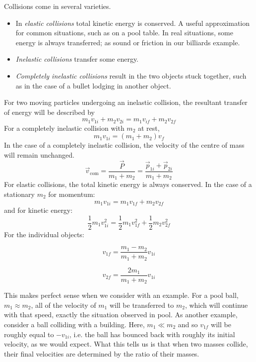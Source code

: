 \documentclass[12pt]{report}
\begin{document}
\bigskip
Collisions come in several varieties.

\begin{itemize}
    \item In \textit{elastic collisions} total kinetic energy is conserved.
    A useful approximation for common situations, such as on a pool table. 
    In real situations, some energy is always transferred; as sound or friction
    in our billiards example.
    \item \textit{Inelastic collisions} transfer some energy.
    \item \textit{Completely inelastic collisions} result in the two objects
    stuck together, such as in the case of a bullet lodging in another object. 
\end{itemize}
For two moving particles undergoing an inelastic collision, the resultant
transfer of energy will be described by
\[m_1v_{1i} + m_2v_{2i} = m_1v_{if} + m_2v_{2f}\]
For a completely inelastic collision with \(m_2\) at rest,
\[m_1v_{1i} = (m_1 + m_2)v_f\]
In the case of a completely inelastic collision, the velocity of the centre
of mass will remain unchanged.
\[\vec{v}_{\mathrm{com}} = \frac{\vec{P}}{m_1 + m_2} = \frac{\vec{p}_{1i} + 
\vec{p}_{2i}}{m_1 + m_2}\]
For elastic collisions, the total kinetic energy is always conserved. In the
case of a stationary \(m_2\) for momentum:
\[m_1v_{1i} = m_1v_{1f} + m_2v_{2f}\]
and for kinetic energy:
\[\frac{1}{2}m_1v^2_{1i} = \frac{1}{2}m_1v^2_{1f} + \frac{1}{2}m_2v^2_{2f}\]
For the individual objects:

\begin{minipage}[h]{0.4\linewidth}
    \[v_{1f} = \frac{m_1 - m_2}{m_1 + m_2}v_{1i}\]    
\end{minipage}
\begin{minipage}[h]{0.4\linewidth}
    \[v_{2f} = \frac{2m_1}{m_1 + m_2}v_{1i}\]    
\end{minipage}

\bigskip
This makes perfect sense when we consider with an example. For a pool ball, 
\(m_1 \approx m_2\), all of the velocity of \(m_1\) will be transferred to
\(m_2\), which will continue with that speed, exactly the situation observed
in pool. As another example, consider a ball colliding with a building. Here,
\(m_1 \ll m_2\) and so \(v_{1f}\) will be roughly equal to \(-v_{1i}\), i.e.
the ball has bounced back with roughly its initial velocity, as we would 
expect. What this tells us is that when two masses collide, their final 
velocities are determined by the ratio of their masses.
\end{document}
